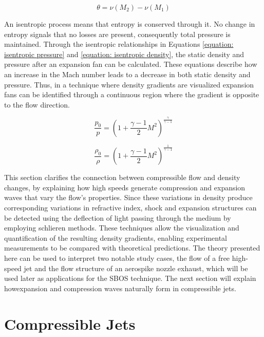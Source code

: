 \begin{equation}
\label{equation: Prandtl-Meyer turning angle}
    \theta = \nu(M_2) - \nu(M_1)
\end{equation}

\par An isentropic process means that entropy is conserved through it. No change in entropy signals that no losses are present, consequently total pressure is maintained. Through the isentropic relationships in Equations \ref{equation: isentropic pressure} and \ref{equation: isentropic density}, the static density and pressure after an expansion fan can be calculated. These equations describe how an increase in the Mach number leads to a decrease in both static density and pressure. Thus, in a technique where density gradients are visualized expansion fans can be identified through a continuous region where the gradient is opposite to the flow direction.

\begin{equation}
\label{equation: isentropic pressure}
    \frac{p_0}{p} = \left(1 + \frac{\gamma - 1}{2}M^2\right)^{\frac{\gamma}{\gamma - 1}}
\end{equation}

\begin{equation}
\label{equation: isentropic density}
    \frac{\rho_0}{\rho} = \left(1 + \frac{\gamma - 1}{2}M^2\right)^{\frac{1}{\gamma - 1}}
\end{equation}


\par This section clarifies the connection between compressible flow and density changes, by explaining how high speeds generate compression and expansion waves that vary the flow's properties. Since these variations in density produce corresponding variations in refractive index, shock and expansion structures can be detected using the deflection of light passing through the medium by employing schlieren methods. These techniques allow the visualization and quantification of the resulting density gradients, enabling experimental measurements to be compared with theoretical predictions. The theory presented here can be used to interpret two notable study cases, the flow of a free high-speed jet and the flow structure of an aerospike nozzle exhaust, which will be used later as applications for the SBOS technique. The next section will explain howexpansion and compression waves naturally form in compressible jets.

\section{Compressible Jets}
\label{section: Compressible Jet Theory}

